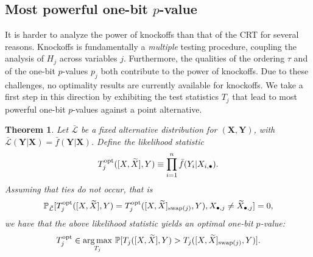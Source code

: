 \documentclass[12pt]{article}
\newtheorem{theorem}{Theorem}
\theoremstyle{definition}
\theoremstyle{remark}
\newcommand{\prx}{\bm X}
\newcommand{\srx}{X}
\newcommand{\srxk}{\widetilde X}
\newcommand{\pry}{{\bm Y}}
\newcommand{\sry}{Y}
\begin{document}
\subsection{Most powerful one-bit $p$-value}

It is harder to analyze the power of knockoffs than that of the CRT for several reasons. Knockoffs is fundamentally a \textit{multiple} testing procedure, coupling the analysis of $H_j$ across variables $j$. Furthermore, the qualities of the ordering $\tau$ and of the one-bit $p$-values $p_j$ both contribute to the power of knockoffs. Due to these challenges, no optimality results are currently available for knockoffs. We take a first step in this direction by exhibiting the test statistics $T_j$ that lead to most powerful one-bit $p$-values against a point alternative. 

\begin{theorem} \label{prop:knockoff-optimality}
	Let $\bar{\mathcal L}$ be a fixed alternative distribution for $(\prx,\pry)$, with $\bar{\mathcal L}(\pry|\prx) = \bar f(\pry|\prx)$. Define the likelihood statistic
	\begin{equation}
	T_j^{\textnormal{opt}}([\srx, \srxk], \sry) \equiv \prod_{i = 1}^n\bar f(\sry_i|\srx_{i,\bullet}).
	\label{log-likelihood-ratio-knockoffs}
	\end{equation}
	Assuming that ties do not occur, that is
	\begin{equation}
	\mathbb P_{\bar {\mathcal L}}[T^{\textnormal{opt}}_j([\srx, \srxk], \sry) = T^{\textnormal{opt}}_j([\srx, \srxk]_{\textnormal{swap}(j)}, \sry), \srx_{\bullet, j} \neq \srxk_{\bullet, j}] = 0, 
	\label{nondegeneracy-assumption}
	\end{equation}
	we have that the above likelihood statistic yields an optimal one-bit $p$-value:
	\begin{equation}
	T_j^{\textnormal{opt}} \in \underset{T_j}{\arg \max}\ \mathbb P[T_j([\srx, \srxk], \sry) > T_j([\srx, \srxk]_{\textnormal{swap}(j)}, \sry)].
	\label{unconditional-knockoff-optimality}
	\end{equation}
\end{theorem}
\end{document}
